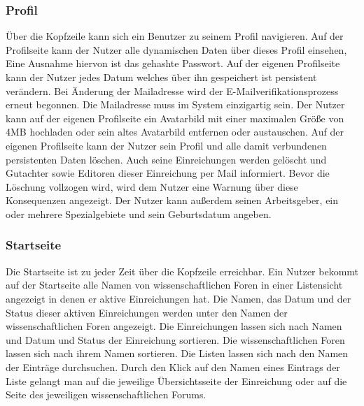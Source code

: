 \subsubsection{Profil}
\begin{description}
     Über die Kopfzeile kann sich ein Benutzer zu seinem Profil navigieren.
     Auf der Profilseite kann der Nutzer alle dynamischen Daten über dieses Profil einsehen,
    Eine Ausnahme hiervon ist das gehashte Passwort. %
     Auf der eigenen Profilseite kann der Nutzer jedes Datum %
    welches über ihn gespeichert ist persistent verändern.
     Bei Änderung der Mailadresse wird der E-Mailverifikationsprozess erneut
    begonnen. Die Mailadresse muss im System einzigartig sein. %
     Der Nutzer kann auf der eigenen Profilseite ein Avatarbild mit einer maximalen
    Größe von 4MB hochladen oder sein altes Avatarbild entfernen oder austauschen. %
     Auf der eigenen Profilseite kann der Nutzer sein Profil und alle damit verbundenen persistenten
    Daten löschen. Auch seine Einreichungen werden gelöscht und Gutachter sowie Editoren dieser
    Einreichung per Mail informiert. Bevor die Löschung vollzogen wird, wird dem Nutzer
    eine Warnung über diese Konsequenzen angezeigt.
     Der Nutzer kann außerdem seinen Arbeitsgeber, ein oder mehrere Spezialgebiete
    und sein Geburtsdatum angeben.
\end{description}

\subsubsection{Startseite}
\begin{description}
     Die Startseite ist zu jeder Zeit über die Kopfzeile erreichbar.
     Ein Nutzer bekommt auf der Startseite alle Namen von wissenschaftlichen Foren
    in einer Listensicht angezeigt in denen er aktive Einreichungen hat.
    Die Namen, das Datum und der Status dieser aktiven Einreichungen werden unter den Namen der wissenschaftlichen
    Foren angezeigt.
     Die Einreichungen lassen sich nach Namen und Datum und Status
    der Einreichung sortieren. Die wissenschaftlichen Foren lassen sich nach ihrem Namen sortieren.
     Die Listen lassen sich nach den Namen der Einträge durchsuchen.
     Durch den Klick auf den Namen eines Eintrags der Liste gelangt man auf die jeweilige Übersichtsseite
    der Einreichung oder auf die Seite des jeweiligen wissenschaftlichen Forums.
\end{description}


